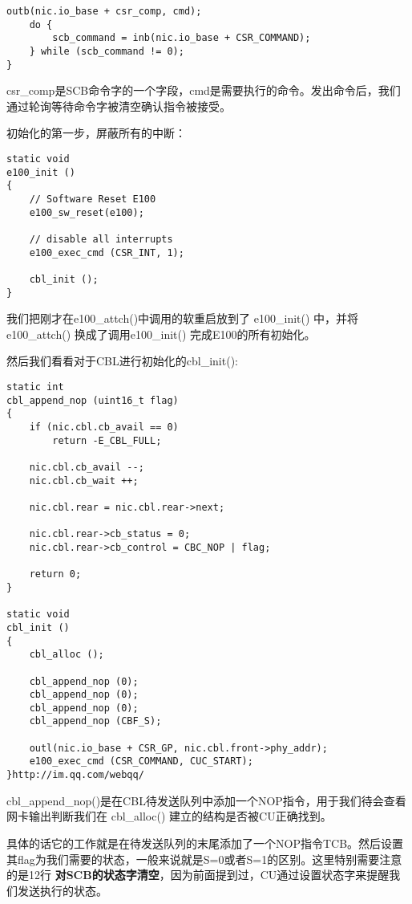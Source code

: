 \documentclass{article}
\newcommand{\highlight}[1]{{\bfseries \color{red}  #1}}
\newcommand{\funcname}[1]{{\ttfamily \small #1}}
\begin{document}
\begin{CJK*}{UTF8}{gkai}
\begin{lstlisting}[style=ccode, title={\scriptsize \ttfamily \bfseries kern/e100.c: e100\_exec\_cmd()}]
    outb(nic.io_base + csr_comp, cmd);
    do {
        scb_command = inb(nic.io_base + CSR_COMMAND);
    } while (scb_command != 0);
}
\end{lstlisting}

csr\_comp是SCB命令字的一个字段，cmd是需要执行的命令。发出命令后，我们通过轮询等待命令字被清空确认指令被接受。

初始化的第一步，屏蔽所有的中断：

\begin{lstlisting}[style=ccode, title={\scriptsize \ttfamily \bfseries kern/e100.c: e100\_init()}]
static void
e100_init ()
{
    // Software Reset E100
    e100_sw_reset(e100);

    // disable all interrupts
    e100_exec_cmd (CSR_INT, 1);

    cbl_init ();
}
\end{lstlisting}

我们把刚才在\funcname{e100\_attch()}中调用的软重启放到了 \funcname{e100\_init()} 中，并将 \funcname{e100\_attch()} 换成了调用\funcname{e100\_init()} 完成E100的所有初始化。

然后我们看看对于CBL进行初始化的\funcname{cbl\_init()}:

\begin{lstlisting}[style=ccode, title={\scriptsize \ttfamily \bfseries kern/e100.c: cbl\_init()}]
static int
cbl_append_nop (uint16_t flag)
{
    if (nic.cbl.cb_avail == 0)
        return -E_CBL_FULL;

    nic.cbl.cb_avail --;
    nic.cbl.cb_wait ++;

    nic.cbl.rear = nic.cbl.rear->next;

    nic.cbl.rear->cb_status = 0;
    nic.cbl.rear->cb_control = CBC_NOP | flag;

    return 0;
}

static void
cbl_init () 
{
    cbl_alloc ();

    cbl_append_nop (0);
    cbl_append_nop (0);
    cbl_append_nop (0);
    cbl_append_nop (CBF_S);

    outl(nic.io_base + CSR_GP, nic.cbl.front->phy_addr);
    e100_exec_cmd (CSR_COMMAND, CUC_START); 
}http://im.qq.com/webqq/
\end{lstlisting}

\funcname{cbl\_append\_nop()}是在CBL待发送队列中添加一个NOP指令，用于我们待会查看网卡输出判断我们在 \funcname{cbl\_alloc()} 建立的结构是否被CU正确找到。

具体的话它的工作就是在待发送队列的末尾添加了一个NOP指令TCB。然后设置其flag为我们需要的状态，一般来说就是S=0或者S=1的区别。这里特别需要注意的是12行\highlight{对SCB的状态字清空}，因为前面提到过，CU通过设置状态字来提醒我们发送执行的状态。


\end{CJK*}
\end{document}
